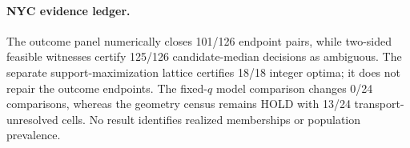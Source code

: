 \paragraph{NYC evidence ledger.} The outcome panel numerically closes 101/126 endpoint pairs, while two-sided feasible witnesses certify 125/126 candidate-median decisions as ambiguous. The separate support-maximization lattice certifies 18/18 integer optima; it does not repair the outcome endpoints. The fixed-$q$ model comparison changes 0/24 comparisons, whereas the geometry census remains HOLD with 13/24 transport-unresolved cells. No result identifies realized memberships or population prevalence.

